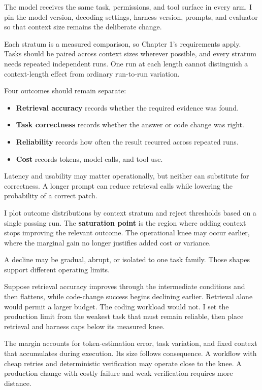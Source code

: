 The model receives the same task, permissions, and tool surface in every arm. I pin the model version, decoding settings, harness version, prompts, and evaluator so that context size remains the deliberate change.

Each stratum is a measured comparison, so Chapter 1's requirements apply. Tasks should be paired across context sizes wherever possible, and every stratum needs repeated independent runs. One run at each length cannot distinguish a context-length effect from ordinary run-to-run variation.


Four outcomes should remain separate:

\begin{itemize}
\tightlist
\item
  \textbf{Retrieval accuracy} records whether the required evidence was found.
\item
  \textbf{Task correctness} records whether the answer or code change was right.
\item
  \textbf{Reliability} records how often the result recurred across repeated runs.
\item
  \textbf{Cost} records tokens, model calls, and tool use.
\end{itemize}

Latency and usability may matter operationally, but neither can substitute for correctness. A longer prompt can reduce retrieval calls while lowering the probability of a correct patch.

I plot outcome distributions by context stratum and reject thresholds based on a single passing run. The \textbf{saturation point} is the region where adding context stops improving the relevant outcome. The operational knee may occur earlier, where the marginal gain no longer justifies added cost or variance.

A decline may be gradual, abrupt, or isolated to one task family. Those shapes support different operating limits.

Suppose retrieval accuracy improves through the intermediate conditions and then flattens, while code-change success begins declining earlier. Retrieval alone would permit a larger budget. The coding workload would not. I set the production limit from the weakest task that must remain reliable, then place retrieval and harness caps below its measured knee.

The margin accounts for token-estimation error, task variation, and fixed context that accumulates during execution. Its size follows consequence. A workflow with cheap retries and deterministic verification may operate close to the knee. A production change with costly failure and weak verification requires more distance.

